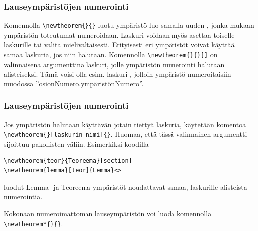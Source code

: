 \begin{frame}[fragile]
    
\end{frame}

\begin{frame}[fragile]
    \frametitle{Lauseympäristöjen numerointi}
    Komennolla \lstinline-\newtheorem{}{}- luotu ympäristö luo samalla uuden , jonka mukaan ympäristön toteutumat numeroidaan. 
    \vaihto
    Laskuri voidaan myös asettaa toiselle laskurille  tai valita mielivaltaisesti. Erityisesti eri ympäristöt voivat käyttää samaa laskuria, jos niin halutaan.
    \vaihto
    Komennolla \lstinline-\newtheorem{}{}[]- on valinnaisena argumenttina laskuri, jolle ympäristön numerointi halutaan alisteiseksi. Tämä voisi olla esim. laskuri , jolloin ympäristö numeroitaisiin muodossa ''osionNumero.ympäristönNumero''.
\end{frame}

\begin{frame}[fragile]
    \frametitle{Lauseympäristöjen numerointi}
    Jos ympäristön halutaan käyttävän jotain tiettyä laskuria, käytetään komentoa \lstinline-\newtheorem{}[laskurin nimi]{}-. Huomaa, että tässä valinnainen argumentti sijoittuu pakollisten väliin. 
    \vaihto
    Esimerkiksi koodilla
    \begin{lstlisting}
\newtheorem{teor}{Teoreema}[section]
\newtheorem{lemma}[teor]{Lemma}<>
    \end{lstlisting}
    luodut Lemma- ja Teoreema-ympäristöt noudattavat samaa, laskurille  alisteista numerointia.
\end{frame}

\begin{frame}[fragile]
    Kokonaan numeroimattoman lauseympäristön voi luoda komennolla \lstinline-\newtheorem*{}{}-.
    
    
\end{frame}


